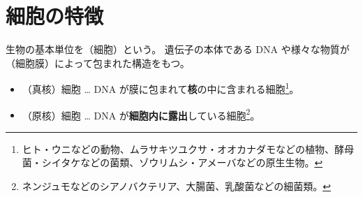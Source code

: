 \section{細胞の特徴}
生物の基本単位を（\textcolor{black!10}{細胞}）という。
遺伝子の本体である DNA や様々な物質が（\textcolor{black!10}{細胞膜}）によって包まれた構造をもつ。
\begin{itemize}\setlength{\leftskip}{-1.00zw}%
\item[\ajMaru{1}]（\textcolor{black!10}{真核}）細胞 … DNA が膜に包まれて\textbf{核}の中に含まれる細胞\footnote{ヒト・ウニなどの動物、ムラサキツユクサ・オオカナダモなどの植物、酵母菌・シイタケなどの菌類、ゾウリムシ・アメーバなどの原生生物。}。
\item[\ajMaru{2}]（\textcolor{black!10}{原核}）細胞 … DNA が\textbf{細胞内に露出}している細胞\footnote{ネンジュモなどのシアノバクテリア、大腸菌、乳酸菌などの細菌類。}。
\end{itemize}
